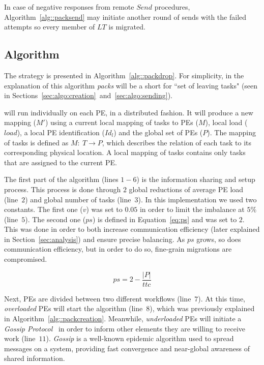 In case of negative responses from remote $Send$ procedures, Algorithm~\ref{alg::packsend} may initiate another round of sends with the failed attempts so every member of $LT$ is migrated.

\subsection{\packdrop Algorithm} \label{sec:algo:main}

The \packdrop strategy is presented in Algorithm~\ref{alg::packdrop}.
For simplicity, in the explanation of this algorithm \textit{packs} will be a short for ``set of leaving tasks" (seen in Sections~\ref{sec:algo:creation}~and~\ref{sec:algo:sending}).

\packdrop will run individually on each PE, in a distributed fashion. 
It will produce a new mapping ($M'$) using a current local mapping of tasks to PEs ($M$), local load ($load$), a local PE identification ($Id_l$) and the global set of PEs ($P$).
The mapping of tasks is defined as $M:\ T \rightarrow P$, which describes the relation of each task to its corresponding physical location.
A local mapping of tasks contains only tasks that are assigned to the current PE.

The first part of the algorithm (lines $1-6$) is the information sharing and setup process. 
This process is done through $2$ global reductions of average PE load (line~$2$) and global number of tasks (line~$3$).
In this implementation we used two constants. 
The first one ($v$) was set to $0.05$ in order to limit the imbalance at $5\%$ (line~$5$).
The second one ($ps$) is defined in Equation~\ref{eq:ps} and was set to $2$.
This was done in order to both increase communication efficiency (later explained in Section~\ref{sec:analysis}) and ensure precise balancing.
As $ps$ grows, so does communication efficiency, but in order to do so, fine-grain migrations are compromised.

\begin{equation}
	ps = 2-\frac{|P|}{ttc}
	\label{eq:ps}
\end{equation}

Next, PEs are divided between two different workflows (line~$7$).
At this time, \textit{overloaded} PEs will start the \batchassembly algorithm (line~$8$), which was previously explained in Algorithm~\ref{alg::packcreation}.
Meanwhile, \textit{underloaded} PEs will initiate a \textit{Gossip Protocol}~\cite{gossip} in order to inform other elements they are willing to receive work (line~$11$).
\textit{Gossip} is a well-known epidemic algorithm used to spread messages on a system, providing fast convergence and near-global awareness of shared information.

